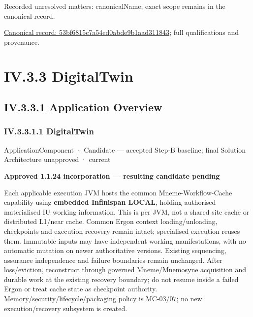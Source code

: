 {\small Recorded unresolved matters: canonicalName; exact scope remains in the canonical record.}\par
{\footnotesize \href{../../../../../../../continuum/application/application-component/53bf6815c7a54ed0abde9b1aad311843.md}{Canonical record: 53bf6815c7a54ed0abde9b1aad311843}; full qualifications and provenance.}\par
\section*{IV.3.3 DigitalTwin}
\label{navigation:IV.3.3}

\subsection*{IV.3.3.1 Application Overview}
\label{navigation:IV.3.3.1}

\subsubsection*{IV.3.3.1.1 DigitalTwin}
\label{navigation:IV.3.3.1.1}

\label{element:3f64d339648246e99e8866c8089f8960}
{\small ApplicationComponent · Candidate — accepted Step-B baseline; final Solution Architecture unapproved · current}\par

\par\medskip\textbf{Approved 1.1.24 incorporation — resulting candidate pending}\par


Each applicable execution JVM hosts the common Mneme-Workflow-Cache capability using \textbf{embedded Infinispan LOCAL}, holding authorised materialised IU working information. This is per JVM, not a shared site cache or distributed L1/near cache. Common Ergon context loading/unloading, checkpoints and execution recovery remain intact; specialised execution reuses them. Immutable inputs may have independent working manifestations, with no automatic mutation on newer authoritative versions. Existing sequencing, assurance independence and failure boundaries remain unchanged. After loss/eviction, reconstruct through governed Mneme/Mnemosyne acquisition and durable work at the existing recovery boundary; do not resume inside a failed Ergon or treat cache state as checkpoint authority. Memory/security/lifecycle/packaging policy is MC-03/07; no new execution/recovery subsystem is created.



